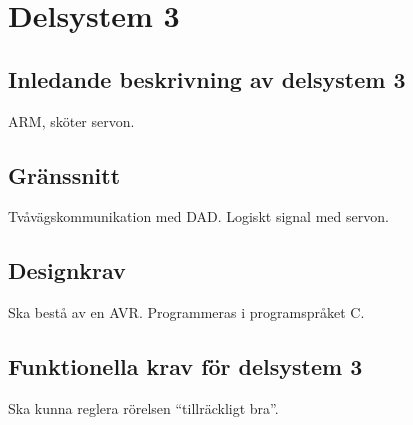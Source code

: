 \section{Delsystem 3}

\subsection{Inledande beskrivning av delsystem 3}
ARM, sköter servon.

\subsection{Gränssnitt}
Tvåvägskommunikation med DAD.
Logiskt signal med servon.

\subsection{Designkrav}
Ska bestå av en AVR.
Programmeras i programspråket C.

\subsection{Funktionella krav för delsystem 3}
Ska kunna reglera rörelsen “tillräckligt bra”.
